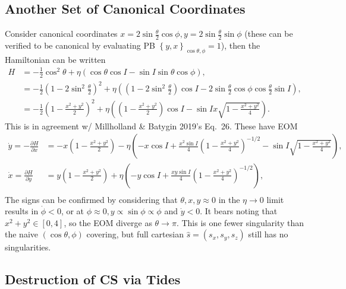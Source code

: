 \documentclass[11pt,
        usenames, %
        dvipsnames %
    ]{article}
\newcommand*{\pd}[2]{\frac{\partial#1}{\partial#2}}
\newcommand*{\p}[1]{\left(#1\right)}
\newcommand*{\z}[1]{\left\{#1\right\}}
\begin{document}
\subsection{Another Set of Canonical Coordinates}

Consider canonical coordinates $x = 2\sin \frac{\theta}{2}\cos \phi, y = 2\sin
\frac{\theta}{2}\sin \phi$ (these can be verified to be canonical by evaluating
PB $\z{y, x}_{\cos \theta, \phi} = 1$), then the Hamiltonian can be written
\begin{align}
    H &= -\frac{1}{2}\cos^2\theta
        + \eta \p{\cos \theta \cos I - \sin I \sin \theta \cos \phi}
        ,\nonumber\\
        &= -\frac{1}{2}\p{1 - 2\sin^2\frac{\theta}{2}}^2
            + \eta\p{\p{1 - 2\sin^2\frac{\theta}{2}}\cos I
            - 2 \sin \frac{\theta}{2}\cos \phi \cos \frac{\theta}{2}\sin I}
            ,\nonumber\\
        &= -\frac{1}{2}\p{1 - \frac{x^2 + y^2}{2}}^2
            + \eta\p{\p{1 - \frac{x^2 + y^2}{2}}\cos I
                - \sin I x\sqrt{1 - \frac{x^2 + y^2}{4}}}.
\end{align}
This is in agreement w/ Millholland \& Batygin 2019's Eq.~26. These have EOM
\begin{align*}
    \dot{y} = -\pd{H}{x} &=
        -x\p{1 - \frac{x^2 + y^2}{2}} - \eta\p{
            -x \cos I + \frac{x^2\sin I}{4}\p{1 - \frac{x^2 + y^2}{4}}^{-1/2}
            - \sin I \sqrt{1 - \frac{x^2 + y^2}{4}}},\\
    \dot{x} = \pd{H}{y} &=
        y\p{1 - \frac{x^2 + y^2}{2}} + \eta\p{
            -y \cos I + \frac{xy\sin I}{4}\p{1 - \frac{x^2 + y^2}{4}}^{-1/2}
            },\\
\end{align*}
The signs can be confirmed by considering that $\theta, x, y \approx 0$ in the
$\eta \to 0$ limit results in $\dot{\phi} < 0$, or at $\phi \approx 0, y \propto
\sin \phi \propto \phi$ and $\dot{y} < 0$. It bears noting that $x^2 + y^2 \in
[0, 4]$, so the EOM diverge as $\theta \to \pi$. This is one fewer singularity
than the naive $\p{\cos\theta, \phi}$ covering, but full cartesian $\hat{s} =
\p{s_x, s_y, s_z}$ still has no singularities.

\subsection{Destruction of CS via Tides}
\end{document}
